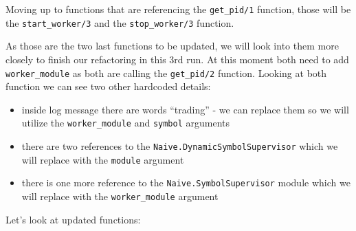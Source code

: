 \documentclass[
  oneside]{book}
\providecommand{\tightlist}{%
  \setlength{\itemsep}{0pt}\setlength{\parskip}{0pt}}
\begin{document}
Moving up to functions that are referencing the \texttt{get\_pid/1} function, those will be the \texttt{start\_worker/3} and the \texttt{stop\_worker/3} function.

As those are the two last functions to be updated, we will look into them more closely to finish our refactoring in this 3rd run. At this moment both need to add \texttt{worker\_module} as both are calling the \texttt{get\_pid/2} function. Looking at both function we can see two other hardcoded details:

\begin{itemize}
\tightlist
\item
  inside log message there are words ``trading'' - we can replace them so we will utilize the \texttt{worker\_module} and \texttt{symbol} arguments
\item
  there are two references to the \texttt{Naive.DynamicSymbolSupervisor} which we will replace with the \texttt{module} argument
\item
  there is one more reference to the \texttt{Naive.SymbolSupervisor} module which we will replace with the \texttt{worker\_module} argument
\end{itemize}

Let's look at updated functions:
\end{document}
